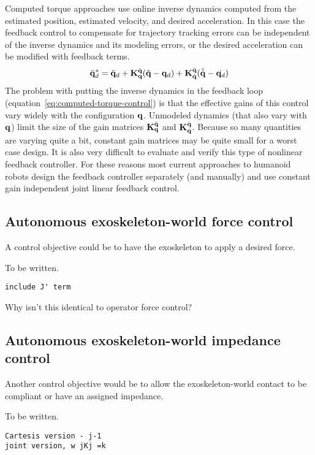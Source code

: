 \documentclass[letterpaper,12pt,fullpage]{article}
\begin{document}
Computed torque approaches use online inverse dynamics computed from the estimated
position, estimated velocity, and desired acceleration.
In this case the feedback control to compensate for trajectory tracking errors can
be independent of the inverse dynamics and its modeling errors, or the desired
acceleration can be modified with feedback terms.
\begin{equation}
\ddot{{\bf q}}_d^* = \ddot{{\bf q}}_{d} + {\bf K}_{{\bf q}}^{\ddot{{\bf q}}} ( \hat{{\bf q}} - {\bf q}_d ) 
+ {\bf K}_{\dot{{\bf q}}}^{\ddot{{\bf q}}} ( \hat{\dot{{\bf q}}} - \dot{{\bf q}_d} )
\label{eq:computed-torque-control}
\end{equation}
The problem with putting the inverse dynamics in the feedback loop 
(equation~\ref{eq:computed-torque-control})
is that the
effective gains of this control vary widely with the configuration ${\bf q}$.
Unmodeled dynamics (that also vary with ${\bf q}$) limit the size of the gain matrices
${\bf K}_{{\bf q}}^{\ddot{{\bf q}}}$ and ${\bf K}_{\dot{{\bf q}}}^{\ddot{{\bf q}}}$. Because so many quantities
are varying quite a bit, constant gain matrices may be quite small for a worst case
design. It is also very difficult to evaluate and 
verify this type of nonlinear feedback controller.
For these reasons most current approaches to humanoid
robots design the feedback controller
separately (and manually) 
and use constant gain independent joint linear feedback control.

\subsection{Autonomous exoskeleton-world force control}

A control objective could be to have the exoskeleton to apply a desired force.

To be written.

\begin{verbatim}
include J' term
\end{verbatim}

Why isn't this identical to operator force control?

\subsection{Autonomous exoskeleton-world impedance control}

Another control objective would be to allow the exoskeleton-world contact to
be compliant or have an assigned impedance.

To be written.

\begin{verbatim}
Cartesis version - j-1
joint version, w jKj =k
\end{verbatim}
\end{document}
